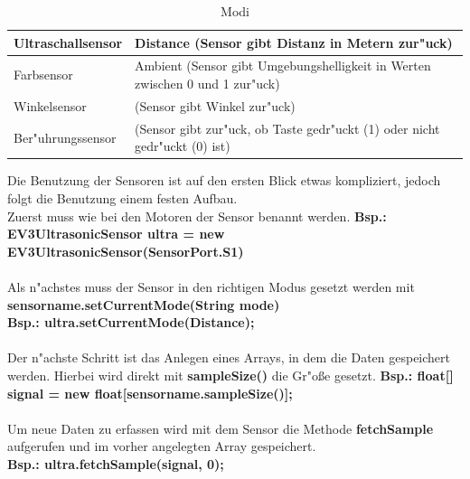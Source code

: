 \begin{table}[H]
	\begin{tabular}{|p{}| p{}|}
		\hline
		Ultraschallsensor& Distance (Sensor gibt Distanz in Metern zur"uck) \\ \hline 
		Farbsensor &  Ambient (Sensor gibt Umgebungshelligkeit in Werten zwischen 0 und 1 zur"uck)\\ \hline 
		Winkelsensor& (Sensor gibt Winkel zur"uck)\\ \hline
		Ber"uhrungssensor& (Sensor gibt zur"uck, ob Taste gedr"uckt (1) oder nicht gedr"uckt (0) ist)\\ \hline
	\end{tabular}
	\caption{Modi}
\end{table}

Die Benutzung der Sensoren ist auf den ersten Blick etwas kompliziert, jedoch folgt die Benutzung einem festen Aufbau.\\

Zuerst muss wie bei den Motoren der Sensor benannt werden.\newline
\textbf{Bsp.: EV3UltrasonicSensor ultra = new EV3UltrasonicSensor(SensorPort.S1)}\\ \\
Als n"achstes muss der Sensor in den richtigen Modus gesetzt werden mit \newline \textbf{sensorname.setCurrentMode(String mode)}\\
\textbf{Bsp.: ultra.setCurrentMode(\glqq Distance\grqq{});}
\\ \\
Der n"achste Schritt ist das Anlegen eines Arrays, in dem die Daten gespeichert werden. Hierbei wird direkt mit \textbf{sampleSize()} die Gr"o\ss{}e gesetzt.
\textbf{Bsp.: float[] signal = new float[sensorname.sampleSize()];}
\\ \\
Um neue Daten zu erfassen wird mit dem Sensor die Methode \textbf{fetchSample} aufgerufen und im vorher angelegten Array gespeichert.\\
\textbf{Bsp.: ultra.fetchSample(signal, 0);}

